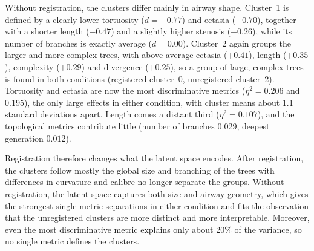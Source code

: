 Without registration, the clusters differ mainly in airway shape. Cluster~1 is defined by a
clearly lower tortuosity ($d = -0.77$) and ectasia ($-0.70$), together with a shorter length
($-0.47$) and a slightly higher stenosis ($+0.26$), while its number of branches is exactly
average ($d = 0.00$). Cluster~2 again groups the larger and more complex trees, with
above-average ectasia ($+0.41$), length ($+0.35$), complexity ($+0.29$) and divergence
($+0.25$), so a group of large, complex trees is found in both conditions (registered cluster~0,
unregistered cluster~2). Tortuosity and ectasia are now the most discriminative metrics
($\eta^2 = 0.206$ and $0.195$), the only large effects in either condition, with cluster means
about 1.1 standard deviations apart. Length comes a distant third ($\eta^2 = 0.107$), and the
topological metrics contribute little (number of branches $0.029$, deepest generation $0.012$).

Registration therefore changes what the latent space encodes. After registration, the clusters
follow mostly the global size and branching of the trees with differences in curvature
and calibre no longer separate the groups. Without registration, the latent space captures both
size and airway geometry, which gives the strongest single-metric separations in either
condition and fits the observation that the unregistered clusters are more distinct and more
interpretable. Moreover, even the most discriminative
metric explains only about 20\% of the variance, so no single metric defines the clusters.




